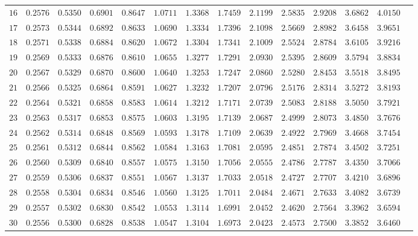 \begin{center}
\begin{small}
\begin{longtable}[c]{rrrrrrrrrrrrrr}
 $16$ & $0.2576$ & $0.5350$ & $0.6901$ & $0.8647$ & $1.0711$ & $1.3368$ & $1.7459$ & $2.1199$ & $2.5835$ & $2.9208$ & $3.6862$ & $4.0150$ \\ 
 $17$ & $0.2573$ & $0.5344$ & $0.6892$ & $0.8633$ & $1.0690$ & $1.3334$ & $1.7396$ & $2.1098$ & $2.5669$ & $2.8982$ & $3.6458$ & $3.9651$ \\ 
 $18$ & $0.2571$ & $0.5338$ & $0.6884$ & $0.8620$ & $1.0672$ & $1.3304$ & $1.7341$ & $2.1009$ & $2.5524$ & $2.8784$ & $3.6105$ & $3.9216$ \\ 
 $19$ & $0.2569$ & $0.5333$ & $0.6876$ & $0.8610$ & $1.0655$ & $1.3277$ & $1.7291$ & $2.0930$ & $2.5395$ & $2.8609$ & $3.5794$ & $3.8834$ \\[4pt] 
 $20$ & $0.2567$ & $0.5329$ & $0.6870$ & $0.8600$ & $1.0640$ & $1.3253$ & $1.7247$ & $2.0860$ & $2.5280$ & $2.8453$ & $3.5518$ & $3.8495$ \\ 
 $21$ & $0.2566$ & $0.5325$ & $0.6864$ & $0.8591$ & $1.0627$ & $1.3232$ & $1.7207$ & $2.0796$ & $2.5176$ & $2.8314$ & $3.5272$ & $3.8193$ \\ 
 $22$ & $0.2564$ & $0.5321$ & $0.6858$ & $0.8583$ & $1.0614$ & $1.3212$ & $1.7171$ & $2.0739$ & $2.5083$ & $2.8188$ & $3.5050$ & $3.7921$ \\ 
 $23$ & $0.2563$ & $0.5317$ & $0.6853$ & $0.8575$ & $1.0603$ & $1.3195$ & $1.7139$ & $2.0687$ & $2.4999$ & $2.8073$ & $3.4850$ & $3.7676$ \\ 
 $24$ & $0.2562$ & $0.5314$ & $0.6848$ & $0.8569$ & $1.0593$ & $1.3178$ & $1.7109$ & $2.0639$ & $2.4922$ & $2.7969$ & $3.4668$ & $3.7454$ \\ 
 $25$ & $0.2561$ & $0.5312$ & $0.6844$ & $0.8562$ & $1.0584$ & $1.3163$ & $1.7081$ & $2.0595$ & $2.4851$ & $2.7874$ & $3.4502$ & $3.7251$ \\ 
 $26$ & $0.2560$ & $0.5309$ & $0.6840$ & $0.8557$ & $1.0575$ & $1.3150$ & $1.7056$ & $2.0555$ & $2.4786$ & $2.7787$ & $3.4350$ & $3.7066$ \\ 
 $27$ & $0.2559$ & $0.5306$ & $0.6837$ & $0.8551$ & $1.0567$ & $1.3137$ & $1.7033$ & $2.0518$ & $2.4727$ & $2.7707$ & $3.4210$ & $3.6896$ \\ 
 $28$ & $0.2558$ & $0.5304$ & $0.6834$ & $0.8546$ & $1.0560$ & $1.3125$ & $1.7011$ & $2.0484$ & $2.4671$ & $2.7633$ & $3.4082$ & $3.6739$ \\ 
 $29$ & $0.2557$ & $0.5302$ & $0.6830$ & $0.8542$ & $1.0553$ & $1.3114$ & $1.6991$ & $2.0452$ & $2.4620$ & $2.7564$ & $3.3962$ & $3.6594$ \\
 $30$ & $0.2556$ & $0.5300$ & $0.6828$ & $0.8538$ & $1.0547$ & $1.3104$ & $1.6973$ & $2.0423$ & $2.4573$ & $2.7500$ & $3.3852$ & $3.6460$ \\ 
\end{longtable}
\end{small}           \end{center}